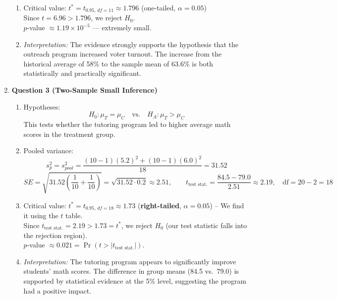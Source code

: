 \documentclass{article}
\begin{document}
\begin{enumerate}
\begin{enumerate}[label=(\alph*)]
    \item Critical value: $t^* = t_{0.95,\,df=11} \approx 1.796$ (one-tailed, $\alpha = 0.05$) \\
    Since $t = 6.96 > 1.796$, we reject $H_0$. \\
    $p$-value $\approx 1.19 \times 10^{-5}$ — extremely small.

    \item \textit{Interpretation:} The evidence strongly supports the hypothesis that the outreach program increased voter turnout. The increase from the historical average of 58\% to the sample mean of 63.6\% is both statistically and practically significant.
  \end{enumerate}

  \item \textbf{Question 3 (Two-Sample Small Inference)}
  \begin{enumerate}[label=(\alph*)]
    \item Hypotheses:
    \[
    H_0: \mu_T = \mu_C \quad\text{vs.}\quad H_A: \mu_T > \mu_C
    \]
    This tests whether the tutoring program led to higher average math scores in the treatment group.

    \item Pooled variance:
    \[
    s_p^2 = s_{pool}^2 = \frac{(10-1)(5.2)^2 + (10-1)(6.0)^2}{18} = 31.52
    \]
    \[
    SE = \sqrt{31.52\left(\frac{1}{10} + \frac{1}{10}\right)} = \sqrt{31.52 \cdot 0.2} \approx 2.51,\qquad
    t_{\text{test stat.}} = \frac{84.5 - 79.0}{2.51} \approx 2.19,\quad \text{df} = 20-2=18
    \]

    \item Critical value: $t^* = t_{0.95,\,df=18} \approx 1.73$ (\textbf{right-tailed}, $\alpha = 0.05$) -- We find it using the $t$ table. \\
    Since $t_{\text{test stat.}} = 2.19 > 1.73=t^*$, we reject $H_0$ (our test statistic falls into the rejection region). \\
    $p$-value $\approx 0.021 = \Pr(t > |t_{\text{test stat.}}|)$.

    \item \textit{Interpretation:} The tutoring program appears to significantly improve students' math scores. The difference in group means (84.5 vs.\ 79.0) is supported by statistical evidence at the 5\% level, suggesting the program had a positive impact.
  \end{enumerate}

\end{enumerate}
\end{document}

